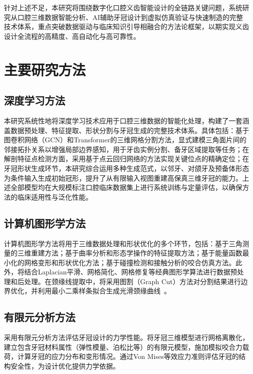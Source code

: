 \documentclass[12pt,hyperref,a4paper,UTF8]{ctexart}
\begin{document}
针对上述不足，本研究将围绕数字化口腔义齿智能设计的全链路关键问题，系统研究从口腔三维数据智能分析、AI辅助牙冠设计到虚拟仿真验证与快速制造的完整技术体系，重点突破数据驱动与临床知识引导相融合的方法论框架，以期实现义齿设计全流程的高精度、高自动化与高可靠性。

\section{主要研究方法}

\subsection{深度学习方法}

本研究系统性地将深度学习技术应用于口腔三维数据的智能化处理，构建了一套涵盖数据预处理、特征提取、形状分割与牙冠生成的完整技术体系。具体包括：基于图卷积网络（GCN）和Transformer的三维网格分割方法，显式建模三角面片间的邻接拓扑关系以增强局部边界感知，用于牙齿实例分割、备牙区域提取等任务；在解剖特征点检测方面，采用基于点云回归网络的方法实现关键位点的精确定位；在牙冠形状生成环节，本研究综合运用多种生成范式，以邻牙、对颌牙及预备体形态为条件输入生成初始冠形，提升了从有限输入视图重建高保真三维牙冠的能力。上述全部模型均在大规模标注口腔临床数据集上进行系统训练与定量评估，以确保方法的临床适用性与泛化性能。

\subsection{计算机图形学方法}

计算机图形学方法将用于三维数据处理和形状优化的多个环节，包括：基于三角测量的三维重建方法；基于曲率分析和形态学操作的特征提取方法；基于能量函数最小化的网格变形和形状优化方法；基于碰撞检测和接触分析的咬合仿真方法。此外，将结合Laplacian平滑、网格简化、网格修复等经典图形学算法进行数据预处理和后处理。在颈缘线提取中，将采用图割（Graph Cut）方法对分割结果进行边界优化，并利用最小二乘样条拟合生成光滑颈缘曲线~\cite{broll2024generative}。

\subsection{有限元分析方法}

采用有限元分析方法评估牙冠设计的力学性能。将牙冠三维模型进行网格离散化，建立包含牙冠材料属性（弹性模量、泊松比等）的有限元模型，施加模拟咬合力载荷，计算牙冠的应力分布和变形情况。通过Von Mises等效应力准则评估牙冠的结构安全性，为设计优化提供力学依据。
\end{document}
